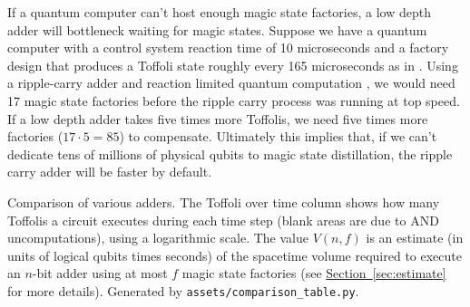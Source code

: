 \documentclass[onecolumn,unpublished]{quantumarticle}
\theoremstyle{definition}
\theoremstyle{definition}
\theoremstyle{definition}
\renewcommand{\sec}[1]{\hyperref[sec:#1]{Section~\ref*{sec:#1}}}
\begin{document}
If a quantum computer can't host enough magic state factories, a low depth adder will bottleneck waiting for magic states.
Suppose we have a quantum computer with a control system reaction time of 10 microseconds and a factory design that produces a Toffoli state roughly every 165 microseconds as in \cite{gidney2019autoccz}.
Using a ripple-carry adder and reaction limited quantum computation \cite{fowler2012timeoptimal,gidney2019autoccz}, we would need 17 magic state factories before the ripple carry process was running at top speed.
If a low depth adder takes five times more Toffolis, we need five times more factories ($17 \cdot 5 = 85$) to compensate.
Ultimately this implies that, if we can't dedicate tens of millions of physical qubits to magic state distillation, the ripple carry adder will be faster by default.

\begin{table}
\centering
\resizebox{\linewidth}{!}{

}
    \caption{Comparison of various adders.
    The Toffoli over time column shows how many Toffolis a circuit executes during each time step (blank areas are due to AND uncomputations), using a logarithmic scale.
    The value $V(n,f)$ is an estimate (in units of logical qubits times seconds) of the spacetime volume required to execute an $n$-bit adder using at most $f$ magic state factories (see \sec{estimate} for more details).
    Generated by \texttt{assets/comparison\_table.py}.
    }
    \label{tbl:comparison}
\end{table}
\end{document}
